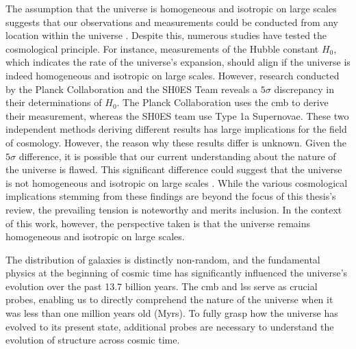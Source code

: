 The assumption that the universe is homogeneous and isotropic on large scales suggests that our observations and measurements could be conducted from any location within the universe \citep{clarkson_general_2008}. Despite this, numerous studies have tested the cosmological principle. For instance, measurements of the Hubble constant $H_0$, which indicates the rate of the universe's expansion, should align if the universe is indeed homogeneous and isotropic on large scales. However, research conducted by the Planck Collaboration \citep{planck_collaboration_planck_2020-1} and the SH0ES Team \citep{riess_comprehensive_2022} reveals a $5\sigma$ discrepancy in their determinations of $H_0$. The Planck Collaboration uses the \gls{cmb} to derive their measurement, whereas the SH0ES team use Type 1a Supernovae. These two independent methods deriving different results has large implications for the field of cosmology. However, the reason why these results differ is unknown. Given the $5\sigma$ difference, it is possible that our current understanding about the nature of the universe is flawed. This significant difference could suggest that the universe is not homogeneous and isotropic on large scales \citep{hu_testing_2024}. While the various cosmological implications stemming from these findings are beyond the focus of this thesis's review, the prevailing tension is noteworthy and merits inclusion. In the context of this work, however, the perspective taken is that the universe remains homogeneous and isotropic on large scales.

The distribution of galaxies is distinctly non-random, and the fundamental physics at the beginning of cosmic time has significantly influenced the universe's evolution over the past 13.7 billion years. The \gls{cmb} and \gls{lss} serve as crucial probes, enabling us to directly comprehend the nature of the universe when it was less than one million years old (Myrs). To fully grasp how the universe has evolved to its present state, additional probes are necessary to understand the evolution of structure across cosmic time.
